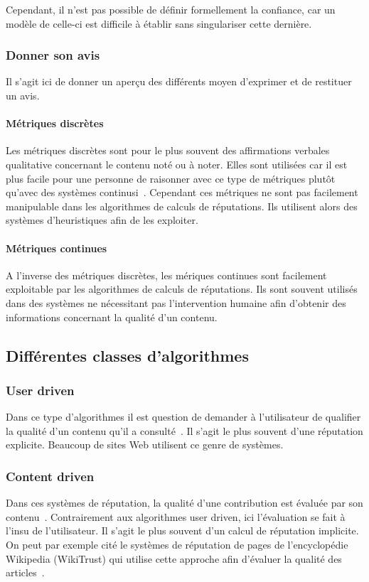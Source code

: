 \documentclass[a4paper, 11pt]{article} %
\begin{document}
Cependant, il n'est pas possible de définir formellement la confiance, car un modèle de celle-ci est difficile à établir sans singulariser cette dernière.

\subsubsection{Donner son avis}
Il s'agit ici de donner un aperçu des différents moyen d'exprimer et de restituer un avis.

\paragraph{Métriques discrètes}
Les métriques discrètes sont pour le plus souvent des affirmations verbales qualitative concernant le contenu noté ou à noter.
Elles sont utilisées car il est plus facile pour une personne de raisonner avec ce type de métriques plutôt qu'avec des systèmes continusi~\cite{JosangIsmailBoyd2007}.
Cependant ces métriques ne sont pas facilement manipulable dans les algorithmes de calculs de réputations.
Ils utilisent alors des systèmes d'heuristiques afin de les exploiter.

\paragraph{Métriques continues}
A l'inverse des métriques discrètes, les mériques continues sont facilement exploitable par les algorithmes de calculs de réputations.
Ils sont souvent utilisés dans des systèmes ne nécessitant pas l'intervention humaine afin d'obtenir des informations concernant la qualité d'un contenu.

\subsection{Différentes classes d'algorithmes}
\subsubsection{User driven}
Dans ce type d'algorithmes il est question de demander à l'utilisateur de qualifier la qualité d'un contenu qu'il a consulté~\cite{Tulungan2013}.
Il s'agit le plus souvent d'une réputation explicite.
Beaucoup de sites Web utilisent ce genre de systèmes.

\subsubsection{Content driven}
Dans ces systèmes de réputation, la qualité d'une contribution est évaluée par son contenu~\cite{Tulungan2013}.
Contrairement aux algorithmes user driven, ici l'évaluation se fait à l'insu de l'utilisateur.
Il s'agit le plus souvent d'un calcul de réputation implicite.
On peut par exemple cité le systèmes de réputation de pages de l'encyclopédie Wikipedia (WikiTrust) qui utilise cette approche afin d'évaluer la qualité des articles~\cite{WikiTrustSite}.
\end{document}
